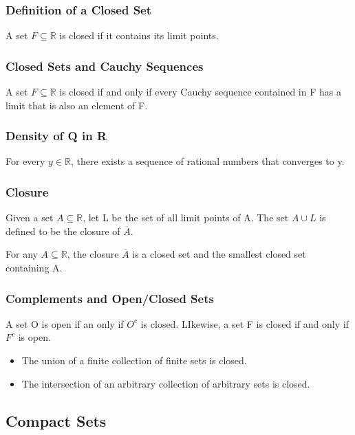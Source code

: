 \documentclass{article}
\begin{document}
\subsubsection{Definition of a Closed Set}
A set $ F \subseteq \mathbb{R} $ is closed if it contains its limit points.

\subsubsection{Closed Sets and Cauchy Sequences}
A set $ F \subseteq \mathbb{R} $ is closed if and only if every Cauchy sequence contained in F has a limit that is also an element of F.

\subsubsection{Density of Q in R}
For every $y \in \mathbb{R} $, there exists a sequence of rational numbers that converges to y.

\subsubsection{Closure}

Given a set $ A \subseteq \mathbb{R} $, let L be the set of all limit points of A. The set $A \cup L $ is defined to be the closure of $ \overline{A}$.

For any $ A \subseteq \mathbb{R} $, the closure $ \overline{A}$ is a closed set and the smallest closed set containing A.

\subsubsection{Complements and Open/Closed Sets}

A set O is open if an only if $ O^c$ is closed. LIkewise, a set F is closed if and only if $F^c$ is open.

\begin{itemize}

\item The union of a finite collection of finite sets is closed.

\item The intersection of an arbitrary collection of arbitrary sets is closed.

\end{itemize}

\subsection{Compact Sets}
\end{document}
